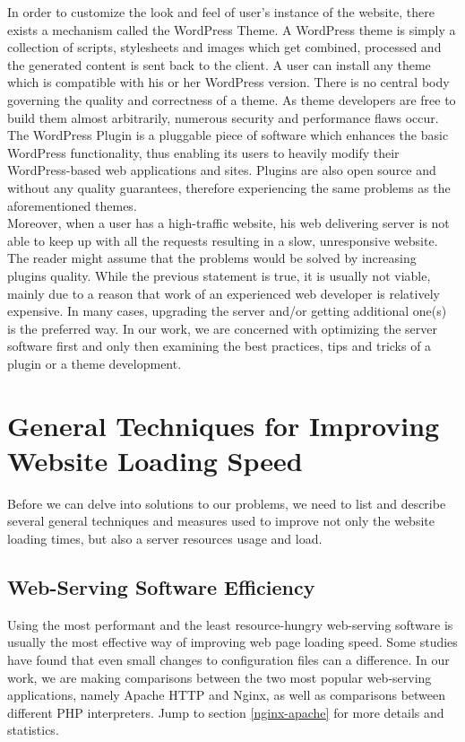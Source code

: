In order to customize the look and feel of user’s instance of the website, there exists a mechanism called the WordPress Theme. A WordPress theme is simply a collection of scripts, stylesheets and images which get combined, processed and the generated content is sent back to the client. A user can install any theme which is compatible with his or her WordPress version. There is no central body governing the quality and correctness of a theme. As theme developers are free to build them almost arbitrarily, numerous security and performance flaws occur. The WordPress Plugin is a pluggable piece of software which enhances the basic WordPress functionality, thus enabling its users to heavily modify their WordPress-based web applications and sites. Plugins are also open source and without any quality guarantees, therefore experiencing the same problems as the aforementioned themes. \\

Moreover, when a user has a high-traffic website, his web delivering server is not able to keep up with all the requests resulting in a slow, unresponsive website. The reader might assume that the problems would be solved by increasing plugins quality. While the previous statement is true, it is usually not viable, mainly due to a reason that work of an experienced web developer is relatively expensive. In many cases, upgrading the server and/or getting additional one(s) is the preferred way. In our work, we are concerned with optimizing the server software first and only then examining the best practices, tips and tricks of a plugin or a theme development.

\section{General Techniques for Improving Website Loading Speed}

Before we can delve into solutions to our problems, we need to list and describe several general techniques and measures used to improve not only the website loading times, but also a server resources usage and load.

\subsection{Web-Serving Software Efficiency}

Using the most performant and the least resource-hungry web-serving software is usually the most effective way of improving web page loading speed. Some studies have found that even small changes to configuration files can a difference. In our work, we are making comparisons between the two most popular web-serving applications, namely Apache HTTP and Nginx, as well as comparisons between different PHP interpreters. Jump to section \ref{nginx-apache} for more details and statistics. 

